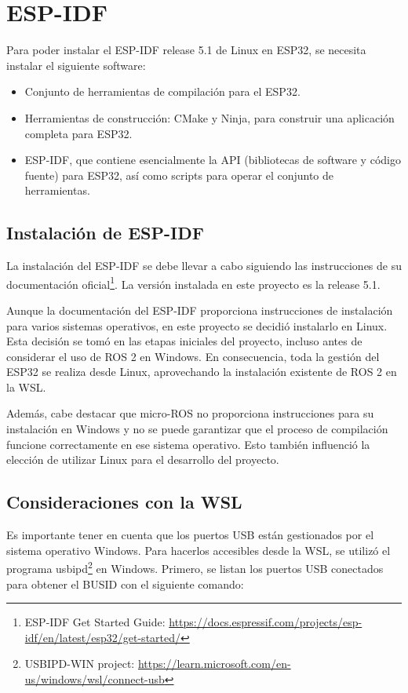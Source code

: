 \section{ESP-IDF}
Para poder instalar el ESP-IDF release 5.1 de Linux en ESP32, se necesita instalar el siguiente software:

\begin{itemize}
  \item Conjunto de herramientas de compilación para el ESP32.
  \item Herramientas de construcción: CMake y Ninja, para construir una aplicación completa para ESP32.
  \item ESP-IDF, que contiene esencialmente la API (bibliotecas de software y código fuente) para ESP32, así como scripts para operar el conjunto de herramientas.
\end{itemize}

\subsection{Instalación de ESP-IDF}
La instalación del ESP-IDF se debe llevar a cabo siguiendo las instrucciones de su documentación oficial\footnote{ESP-IDF Get Started Guide: \url{https://docs.espressif.com/projects/esp-idf/en/latest/esp32/get-started/}}. La versión instalada en este proyecto es la release 5.1.



Aunque la documentación del ESP-IDF proporciona instrucciones de instalación para varios sistemas operativos, en este proyecto se decidió instalarlo en Linux. Esta decisión se tomó en las etapas iniciales del proyecto, incluso antes de considerar el uso de ROS 2 en Windows. En consecuencia, toda la gestión del ESP32 se realiza desde Linux, aprovechando la instalación existente de ROS 2 en la WSL.



Además, cabe destacar que micro-ROS no proporciona instrucciones para su instalación en Windows y no se puede garantizar que el proceso de compilación funcione correctamente en ese sistema operativo. Esto también influenció la elección de utilizar Linux para el desarrollo del proyecto.

\subsection{Consideraciones con la WSL}
\label{WLS-considerations}
Es importante tener en cuenta que los puertos USB están gestionados por el sistema operativo Windows. Para hacerlos accesibles desde la WSL, se utilizó el programa usbipd\footnote{USBIPD-WIN project: \url{https://learn.microsoft.com/en-us/windows/wsl/connect-usb}} en Windows. Primero, se listan los puertos USB conectados para obtener el BUSID con el siguiente comando:

